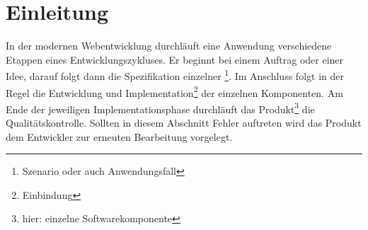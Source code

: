 \chapter{Einleitung}




In der modernen Webentwicklung durchläuft eine Anwendung verschiedene Etappen eines Entwicklungszykluses. Er beginnt bei einem Auftrag oder einer Idee, darauf folgt dann die Spezifikation einzelner \footnote{Szenario oder auch Anwendungsfall}. Im Anschluss folgt in der Regel die Entwicklung und Implementation\footnote{Einbindung} der einzelnen Komponenten. Am Ende der jeweiligen Implementationsphase durchläuft das Produkt\footnote{hier: einzelne Softwarekomponente} die Qualitätskontrolle. Sollten in diesem Abschnitt Fehler auftreten wird das Produkt dem Entwickler zur erneuten Bearbeitung vorgelegt.

